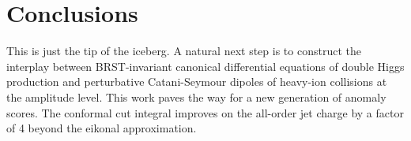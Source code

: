 \section{Conclusions}\label{sec:conclusions}

This is just the tip of the iceberg. A natural next step is to construct
the interplay between BRST-invariant canonical differential equations of
double Higgs production and perturbative Catani-Seymour dipoles of
heavy-ion collisions at the amplitude level. This work paves the way for
a new generation of anomaly scores. The conformal cut integral improves
on the all-order jet charge by a factor of 4 beyond the eikonal
approximation.

